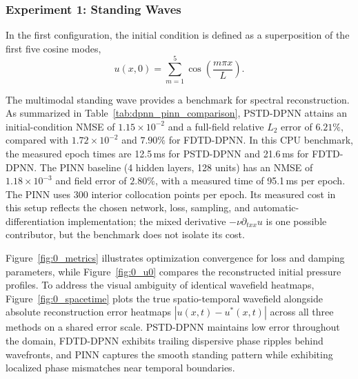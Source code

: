 \documentclass{Configuration_Files/PoliMi3i_thesis}
\newif\ifshowthesischanges
\DeclareRobustCommand{\thesischange}[2]{%
    \ifshowthesischanges
        \textcolor{#1}{#2}%
    \else
        #2%
    \fi
}
\def\thesischange#1#2{#2}%
\begin{document}
\subsubsection{Experiment 1: Standing Waves}
In the first configuration, the initial condition is defined as a superposition of the first five cosine modes,
\[
u(x,0) = \sum_{m=1}^{5} \cos\left(\frac{m \pi x}{L}\right).
\]

\thesischange{red}{The multimodal standing wave provides a benchmark for spectral reconstruction. As summarized in Table~\ref{tab:dpnn_pinn_comparison}, PSTD-DPNN attains an initial-condition NMSE of $1.15\times10^{-2}$ and a full-field relative $L_2$ error of $6.21\%$, compared with $1.72\times10^{-2}$ and $7.90\%$ for FDTD-DPNN. In this CPU benchmark, the measured epoch times are 12.5\,ms for PSTD-DPNN and 21.6\,ms for FDTD-DPNN. The PINN baseline (4 hidden layers, 128 units) has an NMSE of $1.18\times10^{-3}$ and field error of $2.80\%$, with a measured time of 95.1\,ms per epoch. The PINN uses 300 interior collocation points per epoch. Its measured cost in this setup reflects the chosen network, loss, sampling, and automatic-differentiation implementation; the mixed derivative $-\nu\partial_{txx}u$ is one possible contributor, but the benchmark does not isolate its cost.}

\thesischange{red}{Figure~\ref{fig:0_metrics} illustrates optimization convergence for loss and damping parameters, while Figure~\ref{fig:0_u0} compares the reconstructed initial pressure profiles. To address the visual ambiguity of identical wavefield heatmaps, Figure~\ref{fig:0_spacetime} plots the true spatio-temporal wavefield alongside absolute reconstruction error heatmaps $|u(x,t) - u^*(x,t)|$ across all three methods on a shared error scale. PSTD-DPNN maintains low error throughout the domain, FDTD-DPNN exhibits trailing dispersive phase ripples behind wavefronts, and PINN captures the smooth standing pattern while exhibiting localized phase mismatches near temporal boundaries.}
\end{document}
